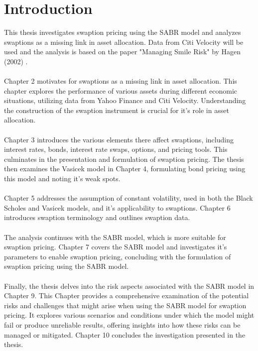 \section{Introduction}

This thesis investigates swaption pricing using the SABR model
and analyzes swaptions as a missing link in asset allocation. 
Data from Citi Velocity will be used and the analysis is 
based on the paper "Managing Smile Risk" by Hagen (2002) 
\cite{Smile}.
\\\\
Chapter 2 motivates for swaptions as a missing link 
in asset allocation. This chapter explores the performance 
of various assets during different economic situations, 
utilizing data from Yahoo Finance and Citi Velocity. 
Understanding the construction of the swaption instrument 
is crucial for it's role in asset allocation.
\\\\
Chapter 3 introduces the various elements there affect 
swaptions, including interest rates, bonds, interest 
rate swaps, options, and pricing tools. This culminates 
in the presentation and formulation of swaption pricing. 
The thesis then examines the Vasicek model in Chapter 4, 
formulating bond pricing using this model and noting it's 
weak spots.
\\\\
Chapter 5 addresses the assumption of constant volatility, 
used in both the Black Scholes and Vasicek models, 
and it's applicability to swaptions. Chapter 6 introduces 
swaption terminology and outlines swaption data.
\\\\
The analysis continues with the SABR model, which is 
more suitable for swaption pricing. Chapter 7 covers the SABR model 
and investigates it's parameters to enable swaption pricing, 
concluding with the formulation of swaption pricing using 
the SABR model.
\\\\
Finally, the thesis delves into the risk aspects associated 
with the SABR model in Chapter 9. This Chapter provides a 
comprehensive examination of the potential risks and 
challenges that might arise when using the SABR model 
for swaption pricing. 
It explores various scenarios and 
conditions under which the model might fail or produce 
unreliable results, offering insights into how these 
risks can be managed or mitigated.
Chapter 10 concludes the investigation presented in the thesis. 
